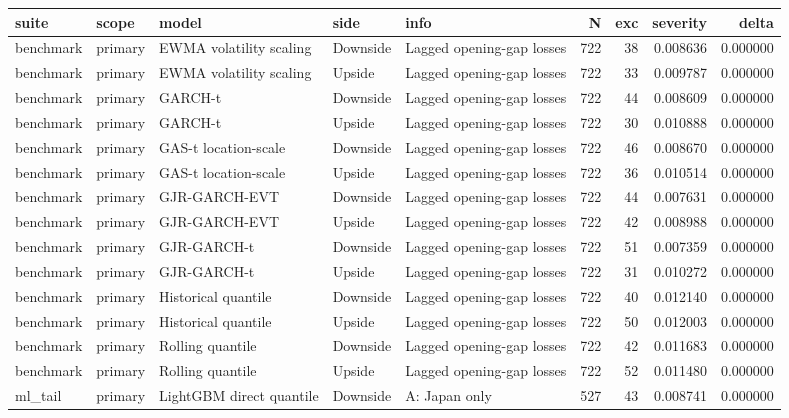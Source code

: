 \begin{tabular}{lllllrrrr}
\toprule
suite & scope & model & side & info & N & exc & severity & delta \\
\midrule
benchmark & primary & EWMA volatility scaling & Downside & Lagged opening-gap losses & 722 & 38 & 0.008636 & 0.000000 \\
benchmark & primary & EWMA volatility scaling & Upside & Lagged opening-gap losses & 722 & 33 & 0.009787 & 0.000000 \\
benchmark & primary & GARCH-t & Downside & Lagged opening-gap losses & 722 & 44 & 0.008609 & 0.000000 \\
benchmark & primary & GARCH-t & Upside & Lagged opening-gap losses & 722 & 30 & 0.010888 & 0.000000 \\
benchmark & primary & GAS-t location-scale & Downside & Lagged opening-gap losses & 722 & 46 & 0.008670 & 0.000000 \\
benchmark & primary & GAS-t location-scale & Upside & Lagged opening-gap losses & 722 & 36 & 0.010514 & 0.000000 \\
benchmark & primary & GJR-GARCH-EVT & Downside & Lagged opening-gap losses & 722 & 44 & 0.007631 & 0.000000 \\
benchmark & primary & GJR-GARCH-EVT & Upside & Lagged opening-gap losses & 722 & 42 & 0.008988 & 0.000000 \\
benchmark & primary & GJR-GARCH-t & Downside & Lagged opening-gap losses & 722 & 51 & 0.007359 & 0.000000 \\
benchmark & primary & GJR-GARCH-t & Upside & Lagged opening-gap losses & 722 & 31 & 0.010272 & 0.000000 \\
benchmark & primary & Historical quantile & Downside & Lagged opening-gap losses & 722 & 40 & 0.012140 & 0.000000 \\
benchmark & primary & Historical quantile & Upside & Lagged opening-gap losses & 722 & 50 & 0.012003 & 0.000000 \\
benchmark & primary & Rolling quantile & Downside & Lagged opening-gap losses & 722 & 42 & 0.011683 & 0.000000 \\
benchmark & primary & Rolling quantile & Upside & Lagged opening-gap losses & 722 & 52 & 0.011480 & 0.000000 \\
ml\_tail & primary & LightGBM direct quantile & Downside & A: Japan only & 527 & 43 & 0.008741 & 0.000000 \\

\end{tabular}
